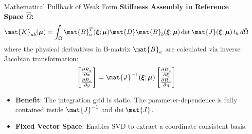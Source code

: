\begin{frame}{Mathematical Pullback of Weak Form}
    \textbf{Stiffness Assembly in Reference Space $\hat{\Omega}$:}
    \begin{equation*}
        \mat{K}_{ab}(\boldsymbol{\mu}) = \int_{\hat{\Omega}} \mat{B}_a^T(\boldsymbol{\xi}; \boldsymbol{\mu}) \mat{D} \mat{B}_b(\boldsymbol{\xi}; \boldsymbol{\mu}) \det\mat{J}(\boldsymbol{\xi}; \boldsymbol{\mu}) \, t_h \, d\hat{\Omega}
    \end{equation*}
    where the physical derivatives in B-matrix $\mat{B}_a$ are calculated via inverse Jacobian transformation:
    \begin{equation*}
        \begin{bmatrix} \frac{\partial R_a}{\partial x} \\[0.3em] \frac{\partial R_a}{\partial y} \end{bmatrix} = \mat{J}^{-1}(\boldsymbol{\xi}; \boldsymbol{\mu}) \begin{bmatrix} \frac{\partial R_a}{\partial \xi} \\[0.3em] \frac{\partial R_a}{\partial \eta} \end{bmatrix}
    \end{equation*}
    \begin{itemize}
        \item \textbf{Benefit}: The integration grid is static. The parameter-dependence is fully contained inside $\mat{J}^{-1}$ and $\det\mat{J}$.
        \item \textbf{Fixed Vector Space}: Enables SVD to extract a coordinate-consistent basis.
    \end{itemize}
\end{frame}

